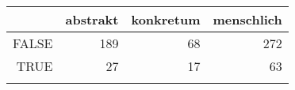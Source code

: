 \begin{tabular}{rrrr}
  \lsptoprule
 & abstrakt & konkretum & menschlich \\ 
  \midrule
FALSE & 189 &  68 & 272 \\ 
  TRUE &  27 &  17 &  63 \\ 
   \lspbottomrule
\end{tabular}
